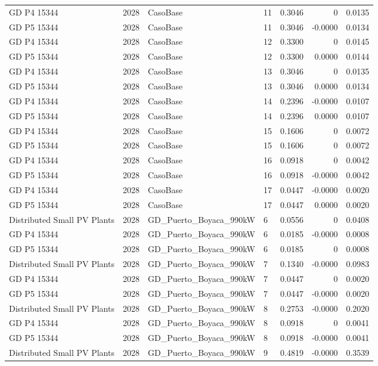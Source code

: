 \documentclass[11pt,a4paper]{article}
\begin{document}
\begin{longtable}{llllrrr}
GD P4 15344 & 2028 & CasoBase & 11 & 0.3046 & 0 & 0.0135 \\
GD P5 15344 & 2028 & CasoBase & 11 & 0.3046 & -0.0000 & 0.0134 \\
GD P4 15344 & 2028 & CasoBase & 12 & 0.3300 & 0 & 0.0145 \\
GD P5 15344 & 2028 & CasoBase & 12 & 0.3300 & 0.0000 & 0.0144 \\
GD P4 15344 & 2028 & CasoBase & 13 & 0.3046 & 0 & 0.0135 \\
GD P5 15344 & 2028 & CasoBase & 13 & 0.3046 & 0.0000 & 0.0134 \\
GD P4 15344 & 2028 & CasoBase & 14 & 0.2396 & -0.0000 & 0.0107 \\
GD P5 15344 & 2028 & CasoBase & 14 & 0.2396 & 0.0000 & 0.0107 \\
GD P4 15344 & 2028 & CasoBase & 15 & 0.1606 & 0 & 0.0072 \\
GD P5 15344 & 2028 & CasoBase & 15 & 0.1606 & 0 & 0.0072 \\
GD P4 15344 & 2028 & CasoBase & 16 & 0.0918 & 0 & 0.0042 \\
GD P5 15344 & 2028 & CasoBase & 16 & 0.0918 & -0.0000 & 0.0042 \\
GD P4 15344 & 2028 & CasoBase & 17 & 0.0447 & -0.0000 & 0.0020 \\
GD P5 15344 & 2028 & CasoBase & 17 & 0.0447 & 0.0000 & 0.0020 \\
Distributed Small PV Plants & 2028 & GD\_Puerto\_Boyaca\_990kW & 6 & 0.0556 & 0 & 0.0408 \\
GD P4 15344 & 2028 & GD\_Puerto\_Boyaca\_990kW & 6 & 0.0185 & -0.0000 & 0.0008 \\
GD P5 15344 & 2028 & GD\_Puerto\_Boyaca\_990kW & 6 & 0.0185 & 0 & 0.0008 \\
Distributed Small PV Plants & 2028 & GD\_Puerto\_Boyaca\_990kW & 7 & 0.1340 & -0.0000 & 0.0983 \\
GD P4 15344 & 2028 & GD\_Puerto\_Boyaca\_990kW & 7 & 0.0447 & 0 & 0.0020 \\
GD P5 15344 & 2028 & GD\_Puerto\_Boyaca\_990kW & 7 & 0.0447 & -0.0000 & 0.0020 \\
Distributed Small PV Plants & 2028 & GD\_Puerto\_Boyaca\_990kW & 8 & 0.2753 & -0.0000 & 0.2020 \\
GD P4 15344 & 2028 & GD\_Puerto\_Boyaca\_990kW & 8 & 0.0918 & 0 & 0.0041 \\
GD P5 15344 & 2028 & GD\_Puerto\_Boyaca\_990kW & 8 & 0.0918 & -0.0000 & 0.0041 \\
Distributed Small PV Plants & 2028 & GD\_Puerto\_Boyaca\_990kW & 9 & 0.4819 & -0.0000 & 0.3539 \\

\end{longtable}
\end{document}
